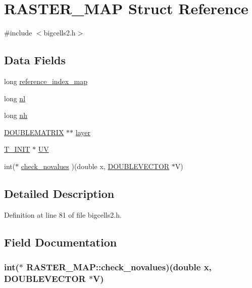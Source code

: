 \hypertarget{struct_r_a_s_t_e_r___m_a_p}{\section{R\-A\-S\-T\-E\-R\-\_\-\-M\-A\-P Struct Reference}
\label{struct_r_a_s_t_e_r___m_a_p}
}


{\ttfamily \#include $<$bigcells2.\-h$>$}

\subsection*{Data Fields}
\begin{DoxyCompactItemize}
\item 
long \hyperlink{struct_r_a_s_t_e_r___m_a_p_a75505cbb814221d0b707b301d789dfba}{reference\-\_\-index\-\_\-map}
\item 
long \hyperlink{struct_r_a_s_t_e_r___m_a_p_ae8f156bbf0bf521a54e26f5d6e15d687}{nl}
\item 
long \hyperlink{struct_r_a_s_t_e_r___m_a_p_af7f08052fd9fcde189a18b31a09df627}{nh}
\item 
\hyperlink{struct_d_o_u_b_l_e_m_a_t_r_i_x}{D\-O\-U\-B\-L\-E\-M\-A\-T\-R\-I\-X} $\ast$$\ast$ \hyperlink{struct_r_a_s_t_e_r___m_a_p_a4e4ca59dd870331996ebb1448ebbd9c8}{layer}
\item 
\hyperlink{struct_t___i_n_i_t}{T\-\_\-\-I\-N\-I\-T} $\ast$ \hyperlink{struct_r_a_s_t_e_r___m_a_p_ad7a7d31ed31d1e4e3dc2bb49bc1fd646}{U\-V}
\item 
int($\ast$ \hyperlink{struct_r_a_s_t_e_r___m_a_p_acf6e77feb86c4f3c6b5ab3432f71c941}{check\-\_\-novalues} )(double x, \hyperlink{struct_d_o_u_b_l_e_v_e_c_t_o_r}{D\-O\-U\-B\-L\-E\-V\-E\-C\-T\-O\-R} $\ast$V)
\end{DoxyCompactItemize}


\subsection{Detailed Description}


Definition at line 81 of file bigcells2.\-h.



\subsection{Field Documentation}
\hypertarget{struct_r_a_s_t_e_r___m_a_p_acf6e77feb86c4f3c6b5ab3432f71c941}{
\subsubsection[{check\-\_\-novalues}]{\setlength{\rightskip}{0pt plus 5cm}int($\ast$ R\-A\-S\-T\-E\-R\-\_\-\-M\-A\-P\-::check\-\_\-novalues)(double x, {\bf D\-O\-U\-B\-L\-E\-V\-E\-C\-T\-O\-R} $\ast$V)}}\label{struct_r_a_s_t_e_r___m_a_p_acf6e77feb86c4f3c6b5ab3432f71c941}


